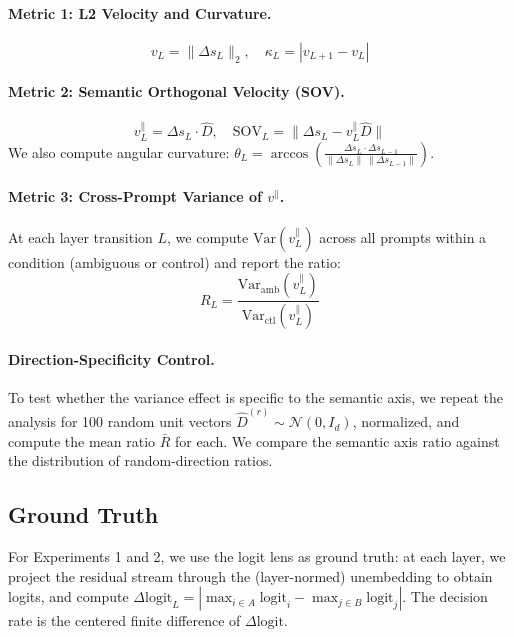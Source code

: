 \documentclass[11pt,a4paper]{article}
\begin{document}
\paragraph{Metric 1: L2 Velocity and Curvature.}
\begin{equation}
v_L = \|\Delta s_L\|_2, \quad \kappa_L = |v_{L+1} - v_L|
\end{equation}

\paragraph{Metric 2: Semantic Orthogonal Velocity (SOV).}
\begin{equation}
v_L^{\parallel} = \Delta s_L \cdot \hat{D}, \quad \text{SOV}_L = \|\Delta s_L - v_L^{\parallel}\hat{D}\|
\end{equation}
We also compute angular curvature: $\theta_L = \arccos\!\left(\frac{\Delta s_L \cdot \Delta s_{L-1}}{\|\Delta s_L\|\,\|\Delta s_{L-1}\|}\right)$.

\paragraph{Metric 3: Cross-Prompt Variance of $v^{\parallel}$.}
At each layer transition $L$, we compute $\text{Var}(v_L^{\parallel})$ across all prompts within a condition (ambiguous or control) and report the ratio:
\begin{equation}
R_L = \frac{\text{Var}_{\text{amb}}(v_L^{\parallel})}{\text{Var}_{\text{ctl}}(v_L^{\parallel})}
\end{equation}

\paragraph{Direction-Specificity Control.}
To test whether the variance effect is specific to the semantic axis, we repeat the analysis for 100 random unit vectors $\hat{D}^{(r)} \sim \mathcal{N}(0, I_d)$, normalized, and compute the mean ratio $\bar{R}$ for each. We compare the semantic axis ratio against the distribution of random-direction ratios.

\subsection{Ground Truth}
For Experiments 1 and 2, we use the logit lens as ground truth: at each layer, we project the residual stream through the (layer-normed) unembedding to obtain logits, and compute $\Delta\text{logit}_L = |\max_{i \in A}\text{logit}_i - \max_{j \in B}\text{logit}_j|$. The decision rate is the centered finite difference of $\Delta\text{logit}$.
\end{document}
